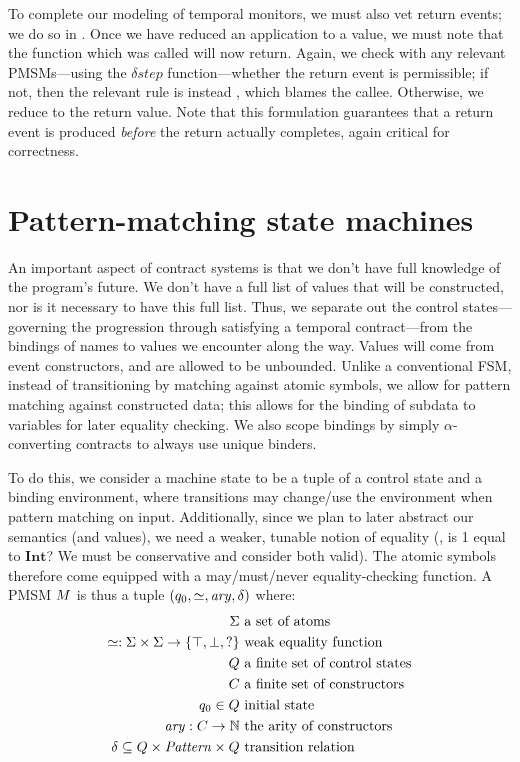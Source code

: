 %
To complete our modeling of temporal monitors, we must also vet return events; we do so in .
%
Once we have reduced an application to a value, we must note that the function which was called will now return.
%
Again, we check with any relevant PMSMs---using the $\delta{}step$ function---whether the return event is permissible; if not, then the relevant rule is instead , which blames the callee.
%
Otherwise, we reduce to the return value.
%
Note that this formulation guarantees that a return event is produced \emph{before} the return actually completes, again critical for correctness.
%

\section{Pattern-matching state machines}
\FloatBarrier

An important aspect of contract systems is that we don't have full knowledge of the program's future.
%
We don't have a full list of values that will be constructed, nor is it necessary to have this full list.
%
Thus, we separate out the control states---governing the progression through satisfying a temporal contract---from the bindings of names to values we encounter along the way.
%
Values will come from event constructors, and are allowed to be unbounded.
%
Unlike a conventional FSM, instead of transitioning by matching against atomic symbols, we allow for pattern matching against constructed data; this allows for the binding of subdata to variables for later equality checking.
%
We also scope bindings by simply $\alpha$-converting contracts to always use unique binders.
%

To do this, we consider a machine state to be a tuple of a control state and a binding environment, where transitions may change/use the environment when pattern matching on input.
%
Additionally, since we plan to later abstract our semantics (and values), we need a weaker, tunable notion of equality (\eg, is 1 equal to $\mathbf{Int}$? We must be conservative and consider both valid).
%
The atomic symbols therefore come equipped with a may/must/never equality-checking function.
%
A PMSM $M$ is thus a tuple $(q_0, \simeq, \mathit{ary}, \delta)$ where:
\begin{align*}
  \Sigma &\text{ a set of atoms} \\
  \simeq : \Sigma \times \Sigma \to \{\top, \bot, ?\} &\text{ weak equality function}\\
  Q &\text{ a finite set of control states} \\
  C &\text{ a finite set of constructors} \\
  q_0 \in Q &\text{ initial state} \\
  \mathit{ary} : C \to {\mathbb N}&\text{ the arity of constructors} \\
  \delta \subseteq Q \times \mathit{Pattern} \times Q & \text{ transition relation}\\[2pt]
\end{align*}

